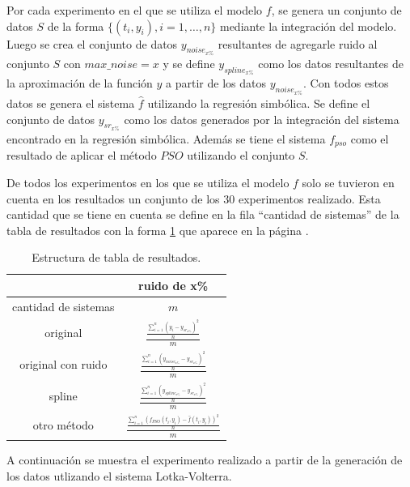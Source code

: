 Por cada experimento en el que se utiliza el modelo $f$, se genera un conjunto de datos $S$ de la forma $\{(t_i, y_i), i=1, \dots, n\}$ mediante la integración del modelo. Luego se crea el conjunto de datos $y_{noise_{x\%}}$ resultantes de agregarle ruido al conjunto $S$ con $max\_noise=x$ y se define $y_{spline_{x\%}}$ como los datos resultantes de la aproximación de la función $y$ a partir de los datos $y_{noise_{x\%}}$. Con todos estos datos se genera el sistema $\hat{f}$ utilizando la regresión simbólica. Se define el conjunto de datos $y_{sr_{x\%}}$ como los datos generados por la integración del sistema encontrado en la regresión simbólica. Además se tiene el sistema $f_{pso}$ como el resultado de aplicar el método $PSO$ \cite{p-pso-6} utilizando el conjunto $S$.

De todos los experimentos en los que se utiliza el modelo $f$ solo se tuvieron en cuenta en los resultados un conjunto de los 30 experimentos realizado. Esta cantidad que se tiene en cuenta se define en la fila ``cantidad de sistemas'' de la tabla de resultados con la forma \ref{table:experiment_form} que aparece en la página \pageref{table:experiment_form}.

\begin{table}
    \centering
    \caption{Estructura de tabla de resultados.}
    \begin{tabular}{|c|c|}
        \hline
                             & \textbf{ruido de x\%}                                                      \\
        \hline
        cantidad de sistemas & $m$                                                                        \\
        \hline
        original             & $\frac{\frac{\sum_{i=1}^n (y_i-y_{sr_{x\%}})^2}{n}}{m}$                    \\
        \hline
        original con ruido   & $\frac{\frac{\sum_{i=1}^n (y_{noise_{x\%}}-y_{sr_{x\%}})^2}{n}}{m}$        \\
        \hline
        spline               & $\frac{\frac{\sum_{i=1}^n (y_{spline_{x\%}}-y_{sr_{x\%}})^2}{n}}{m}$       \\
        \hline
        otro método          & $\frac{\frac{\sum_{i=1}^n (f_{PSO}(t_i, y_i)-\hat{f}(t_i, y_i))^2}{n}}{m}$ \\
        \hline
    \end{tabular}
    \label{table:experiment_form}
\end{table}

A continuación se muestra el experimento realizado a partir de la generación de los datos utlizando el sistema Lotka-Volterra.

